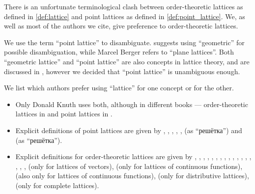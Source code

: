 \begin{remark}\label{rem:lattice_terminology}
  There is an unfortunate terminological clash between order-theoretic lattices as defined in \cref{def:lattice} and point lattices as defined in \cref{def:point_lattice}. We, as well as most of the authors we cite, give preference to order-theoretic lattices.

  We use the term \enquote{point lattice} to disambiguate.  suggests using \enquote{geometric} for possible disambiguation, while Marcel Berger refers to \enquote{plane lattices}. Both \enquote{geometric lattice} and \enquote{point lattice} are also concepts in lattice theory, and are discussed in \cite[80]{Birkhoff1967LatticeTheory}, however we decided that \enquote{point lattice} is unambiguous enough.

  We list which authors prefer using \enquote{lattice} for one concept or for the other.
  \begin{itemize}
    \item Only Donald Knuth uses both, although in different books --- order-theoretic lattices in \cite[exerc. 2.3.2.19]{Knuth1997ArtVol2} and point lattices in \cite[97]{Knuth1997ArtVol2}.

    \item Explicit definitions of point lattices are given by
    ,
    ,
    ,
    ,
    ,
     (as \enquote{решётка}) and
     (as \enquote{решётка}).

    \item Explicit definitions for order-theoretic lattices are given by
    ,
    ,
    ,
    ,
    ,
    ,
    ,
    ,
    ,
    ,
    ,
    ,
    ,
    ,
    ,
    ,
    ,
     (only for lattices of vectors),
     (only for lattices of continuous functions),
     (also only for lattices of continuous functions),
     (only for distributive lattices),
     (only for complete lattices).


\end{itemize}
\end{remark}
